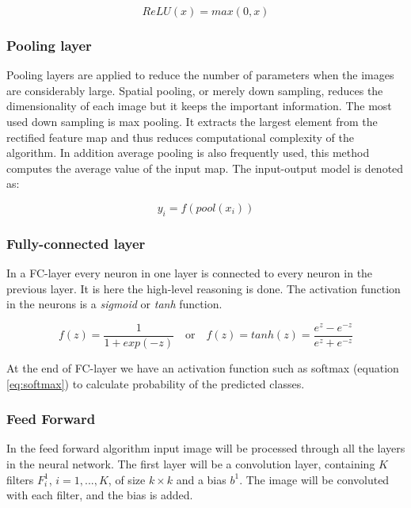 \documentclass[thesis.tex]{subfiles}
\begin{document}
\begin{equation} %
    ReLU(x) = max(0, x)
    \label{eq:relu_func}
\end{equation}


\subsubsection{Pooling layer}
Pooling layers are applied to reduce the number of parameters when the images are considerably large. Spatial pooling, or merely down sampling, reduces the dimensionality of each image but it keeps the important information. The most used down sampling is max pooling. It extracts the largest element from the rectified feature map and thus reduces computational complexity of the algorithm. In addition average pooling is also frequently used, this method computes the average value of the input map. The input-output model is denoted as:

\begin{equation} %
  y_i = f(pool(x_i))
  \label{eq:pool_func}
\end{equation}


\subsubsection{Fully-connected layer}
In a FC-layer every neuron in one layer is connected to every neuron in the previous layer. It is here the high-level reasoning is done. The activation function in the neurons is a \textit{sigmoid} or \textit{tanh} function.

\begin{equation} %
  f(z) = \frac{1}{1+exp(-z)} \quad \text{or} \quad f(z) = tanh(z) = \frac{e^{z} - e^{-z}}{e^{z} + e^{-z}}
\end{equation}

At the end of FC-layer we have an activation function such as softmax (equation \ref{eq:softmax}) to calculate probability of the predicted classes.


\subsubsection{Feed Forward}
In the feed forward algorithm input image will be processed through all the layers in the neural network. The first layer will be a convolution layer, containing $K$ filters $F_i^1$, $i= 1, ..., K$, of size $k \times k$ and a bias $b^1$. The image will be convoluted with each filter, and the bias is added. 
\end{document}

